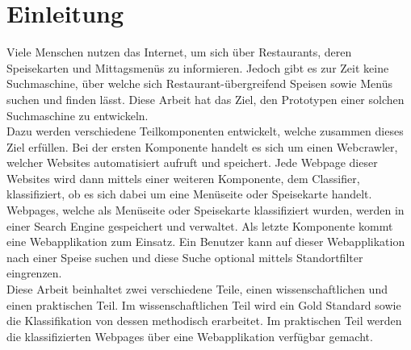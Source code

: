 \chapter{Einleitung}
Viele Menschen nutzen das Internet, um sich über Restaurants, deren Speisekarten und Mittagsmenüs zu informieren.
Jedoch gibt es zur Zeit keine Suchmaschine, über welche sich Restaurant-übergreifend Speisen sowie Menüs suchen und finden lässt.
Diese Arbeit hat das Ziel, den Prototypen einer solchen Suchmaschine zu entwickeln.\\
Dazu werden verschiedene Teilkomponenten entwickelt, welche zusammen dieses Ziel erfüllen.
Bei der ersten Komponente handelt es sich um einen Webcrawler, welcher Websites automatisiert aufruft und speichert.
Jede Webpage dieser Websites wird dann mittels einer weiteren Komponente, dem Classifier, klassifiziert, ob es sich dabei um eine Menüseite oder Speisekarte handelt.
Webpages, welche als Menüseite oder Speisekarte klassifiziert wurden, werden in einer Search Engine gespeichert und verwaltet.
Als letzte Komponente kommt eine Webapplikation zum Einsatz. Ein Benutzer kann auf dieser Webapplikation nach einer Speise suchen und diese Suche optional mittels Standortfilter eingrenzen.\\
Diese Arbeit beinhaltet zwei verschiedene Teile, einen wissenschaftlichen und einen praktischen Teil.
Im wissenschaftlichen Teil wird ein Gold Standard sowie die Klassifikation von dessen methodisch erarbeitet.
Im praktischen Teil werden die klassifizierten Webpages über eine Webapplikation verfügbar gemacht.